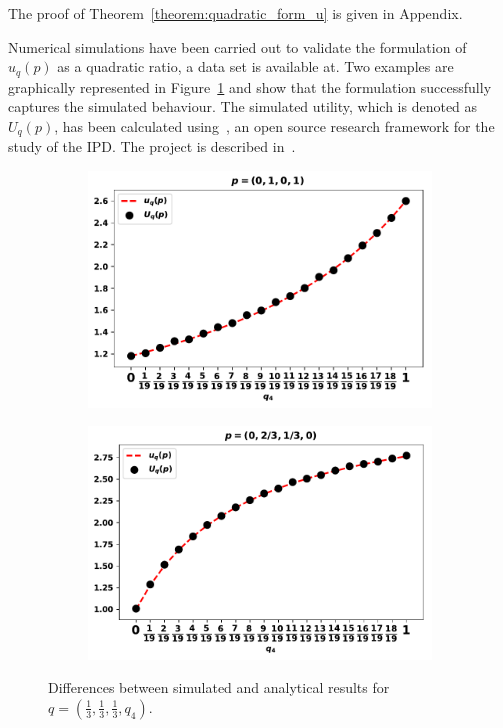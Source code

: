 \documentclass[10pt]{article}
\begin{document}
The proof of Theorem~\ref{theorem:quadratic_form_u} is given in Appendix. %

Numerical simulations have been carried out to validate the formulation of
\(u_q(p)\) as a quadratic ratio, a data set is available at. Two examples are
graphically represented in Figure~\ref{fig:analytical_simulated} and show that
the formulation successfully captures the simulated behaviour. The simulated
utility, which is denoted as \(U_q(p)\), has been calculated
using~\cite{axelrodproject}, an open source research framework for the study of
the IPD. The project is described in~\cite{Knight2016}.

\begin{figure}[!htbp]
    \begin{center}
        \begin{subfigure}{0.45\textwidth}
            \includegraphics[width=\linewidth]{img/validation_against_player_one.pdf}
        \end{subfigure}
        \begin{subfigure}{0.45\textwidth}
            \includegraphics[width=\linewidth]{img/validation_against_player_two.pdf}
        \end{subfigure}
    \end{center}

    \caption{Differences between simulated and analytical results for
            \(q = (\frac{1}{3}, \frac{1}{3}, \frac{1}{3}, q_4)\).}
    \label{fig:analytical_simulated}
\end{figure}
\end{document}
